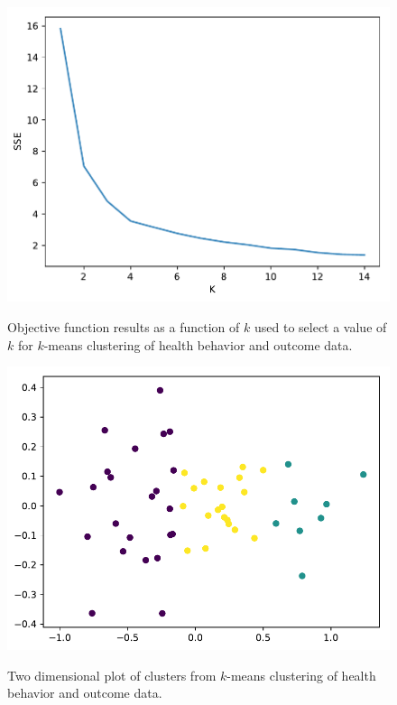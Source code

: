 \documentclass{article}
\begin{document}
\begin{figure}[h]
\centering
\caption{Objective function results as a function of $k$ used to select a value of $k$ for $k$-means clustering of health behavior and outcome data.}
\includegraphics[width=\linewidth]{images/cdc_health_behavior_and_outcomes_kmeans_obj_tuning.pdf}
\label{fig:kmeanshealthselect}
\end{figure}

\begin{figure}[h]
\centering
\caption{Two dimensional plot of clusters from $k$-means clustering of health behavior and outcome data.}
\includegraphics[width=\linewidth]{images/cdc_health_behavior_and_outcomes_kmeans_2d_plot.pdf}
\label{fig:kmeanshealthscat}
\end{figure}
\end{document}
